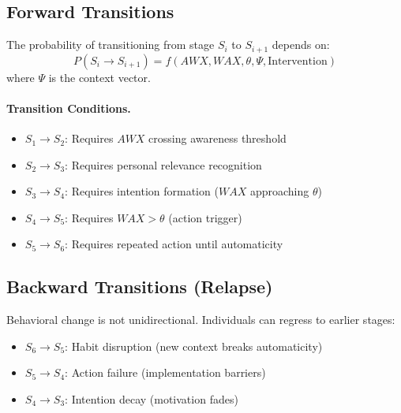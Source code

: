 \subsection{Forward Transitions}

\begin{definition}
The probability of transitioning from stage $S_i$ to $S_{i+1}$ depends on:
\begin{equation}
P(S_i \to S_{i+1}) = f(AWX, WAX, \theta, \Psi, \text{Intervention})
\label{eq:transition-prob}
\end{equation}
where $\Psi$ is the context vector.
\end{definition}

\paragraph{Transition Conditions.}
\begin{itemize}
    \item $S_1 \to S_2$: Requires $AWX$ crossing awareness threshold
    \item $S_2 \to S_3$: Requires personal relevance recognition
    \item $S_3 \to S_4$: Requires intention formation ($WAX$ approaching $\theta$)
    \item $S_4 \to S_5$: Requires $WAX > \theta$ (action trigger)
    \item $S_5 \to S_6$: Requires repeated action until automaticity
\end{itemize}

\subsection{Backward Transitions (Relapse)}
\label{sec:bcj-relapse}

\begin{intuition}
Behavioral change is not unidirectional. Individuals can regress to earlier stages:
\begin{itemize}
    \item $S_6 \to S_5$: Habit disruption (new context breaks automaticity)
    \item $S_5 \to S_4$: Action failure (implementation barriers)
    \item $S_4 \to S_3$: Intention decay (motivation fades)
\end{itemize}
\end{intuition}

